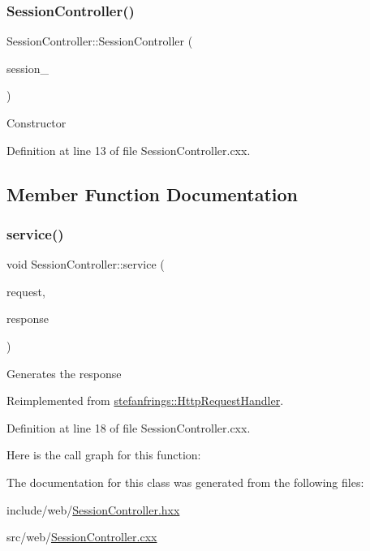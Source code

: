 \subsubsection{\texorpdfstring{Session\+Controller()}{SessionController()}}
{\footnotesize\ttfamily Session\+Controller\+::\+Session\+Controller (\begin{DoxyParamCaption}\item[{\mbox{\hyperlink{classstefanfrings_1_1_http_session_store}{Http\+Session\+Store}} $\ast$}]{session\+\_\+ }\end{DoxyParamCaption})}

Constructor 

Definition at line 13 of file Session\+Controller.\+cxx.



\subsection{Member Function Documentation}
\mbox{\label{classeven_1_1_session_controller_a2eb65af29d53ff51d709cc892611d5a9}} 
\subsubsection{\texorpdfstring{service()}{service()}}
{\footnotesize\ttfamily void Session\+Controller\+::service (\begin{DoxyParamCaption}\item[{\mbox{\hyperlink{classstefanfrings_1_1_http_request}{Http\+Request}} \&}]{request,  }\item[{\mbox{\hyperlink{classstefanfrings_1_1_http_response}{Http\+Response}} \&}]{response }\end{DoxyParamCaption})\hspace{0.3cm}{\ttfamily [virtual]}}

Generates the response 

Reimplemented from \mbox{\hyperlink{classstefanfrings_1_1_http_request_handler_a0a7210907152c46b8b5a47feb64cf6bd}{stefanfrings\+::\+Http\+Request\+Handler}}.



Definition at line 18 of file Session\+Controller.\+cxx.

Here is the call graph for this function\+:


The documentation for this class was generated from the following files\+:\begin{DoxyCompactItemize}
\item 
include/web/\mbox{\hyperlink{_session_controller_8hxx}{Session\+Controller.\+hxx}}\item 
src/web/\mbox{\hyperlink{_session_controller_8cxx}{Session\+Controller.\+cxx}}\end{DoxyCompactItemize}
